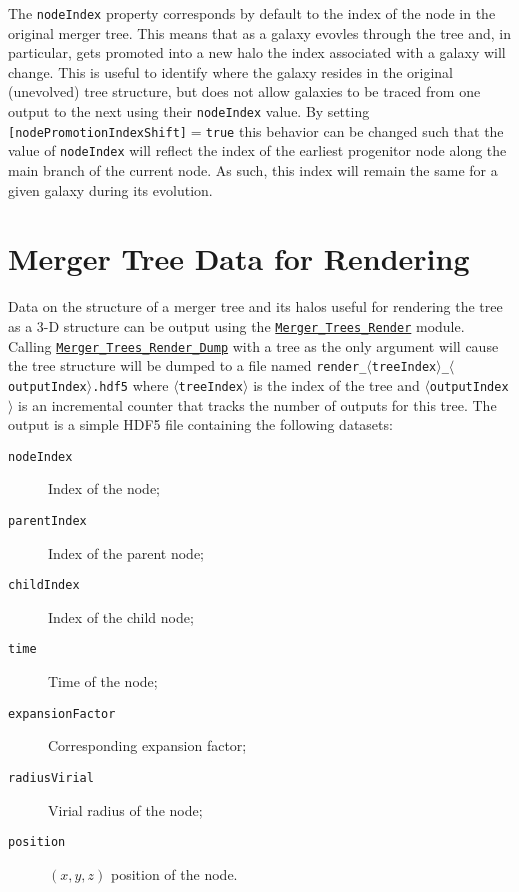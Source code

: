 The {\tt nodeIndex} property corresponds by default to the index of the node in the original merger tree. This means that as a galaxy evovles through the tree and, in particular, gets promoted into a new halo the index associated with a galaxy will change. This is useful to identify where the galaxy resides in the original (unevolved) tree structure, but does not allow galaxies to be traced from one output to the next using their {\tt nodeIndex} value. By setting {\tt [nodePromotionIndexShift]}$=${\tt true} this behavior can be changed such that the value of {\tt nodeIndex} will reflect the index of the earliest progenitor node along the main branch of the current node. As such, this index will remain the same for a given galaxy during its evolution.

\section{Merger Tree Data for Rendering}

Data on the structure of a merger tree and its halos useful for rendering the tree as a 3-D structure can be output using the \hyperlink{merger_trees.render.F90:merger_trees_render}{\tt Merger\_Trees\_Render} module. Calling \hyperlink{merger_trees.render.F90:merger_trees_render:merger_trees_render_dump}{\tt Merger\_Trees\_Render\_Dump} with a tree as the only argument will cause the tree structure will be dumped to a file named {\tt render\_$\langle$treeIndex$\rangle$\_$\langle$outputIndex$\rangle$.hdf5} where $\langle${\tt treeIndex}$\rangle$ is the index of the tree and $\langle${\tt outputIndex}$\rangle$ is an incremental counter that tracks the number of outputs for this tree. The output is a simple HDF5 file containing the following datasets:
\begin{description}
 \item [{\tt nodeIndex}] Index of the node;
 \item [{\tt parentIndex}] Index of the parent node;
 \item [{\tt childIndex}] Index of the child node;
 \item [{\tt time}] Time of the node;
 \item [{\tt expansionFactor}] Corresponding expansion factor;
 \item [{\tt radiusVirial}] Virial radius of the node;
 \item [{\tt position}] $(x,y,z)$ position of the node.
\end{description}

